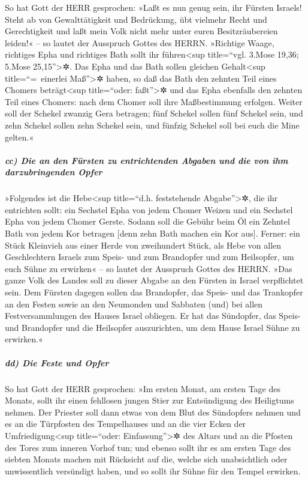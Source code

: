 So hat Gott der HERR gesprochen: »Laßt es nun genug sein,
ihr Fürsten Israels! Steht ab von Gewalttätigkeit und Bedrückung, übt
vielmehr Recht und Gerechtigkeit und laßt mein Volk nicht mehr unter
euren Besitzräubereien leiden!« -- so lautet der Ausspruch Gottes des
HERRN. »Richtige Waage, richtiges Epha und richtiges Bath
sollt ihr führen\textless sup title=``vgl. 3.Mose 19,36; 5.Mose
25,15''\textgreater✲. Das Epha und das Bath sollen
gleichen Gehalt\textless sup title=``=~einerlei Maß''\textgreater✲
haben, so daß das Bath den zehnten Teil eines Chomers
beträgt\textless sup title=``oder: faßt''\textgreater✲ und das Epha
ebenfalls den zehnten Teil eines Chomers: nach dem Chomer soll ihre
Maßbestimmung erfolgen. Weiter soll der Schekel zwanzig
Gera betragen; fünf Schekel sollen fünf Schekel sein, und zehn Schekel
sollen zehn Schekel sein, und fünfzig Schekel soll bei euch die Mine
gelten.«

\hypertarget{cc-die-an-den-fuxfcrsten-zu-entrichtenden-abgaben-und-die-von-ihm-darzubringenden-opfer}{%
\subparagraph{cc) Die an den Fürsten zu entrichtenden Abgaben und die
von ihm darzubringenden
Opfer}\label{cc-die-an-den-fuxfcrsten-zu-entrichtenden-abgaben-und-die-von-ihm-darzubringenden-opfer}}

»Folgendes ist die Hebe\textless sup title=``d.h.
feststehende Abgabe''\textgreater✲, die ihr entrichten sollt: ein
Sechstel Epha von jedem Chomer Weizen und ein Sechstel Epha von jedem
Chomer Gerste. Sodann soll die Gebühr beim Öl ein Zehntel
Bath von jedem Kor betragen {[}denn zehn Bath machen ein Kor aus{]}.
Ferner: ein Stück Kleinvieh aus einer Herde von
zweihundert Stück, als Hebe von allen Geschlechtern Israels zum Speis-
und zum Brandopfer und zum Heilsopfer, um euch Sühne zu erwirken« -- so
lautet der Ausspruch Gottes des HERRN. »Das ganze Volk
des Landes soll zu dieser Abgabe an den Fürsten in Israel verpflichtet
sein. Dem Fürsten dagegen sollen das Brandopfer, das
Speis- und das Trankopfer an den Festen sowie an den Neumonden und
Sabbaten (und) bei allen Festversammlungen des Hauses Israel obliegen.
Er hat das Sündopfer, das Speis- und Brandopfer und die Heilsopfer
auszurichten, um dem Hause Israel Sühne zu erwirken.«

\hypertarget{dd-die-feste-und-opfer}{%
\subparagraph{dd) Die Feste und Opfer}\label{dd-die-feste-und-opfer}}

So hat Gott der HERR gesprochen: »Im ersten Monat, am
ersten Tage des Monats, sollt ihr einen fehllosen jungen Stier zur
Entsündigung des Heiligtums nehmen. Der Priester soll
dann etwas von dem Blut des Sündopfers nehmen und es an die Türpfosten
des Tempelhauses und an die vier Ecken der Umfriedigung\textless sup
title=``oder: Einfassung''\textgreater✲ des Altars und an die Pfosten
des Tores zum inneren Vorhof tun; und ebenso sollt ihr es
am ersten Tage des siebten Monats machen mit Rücksicht auf die, welche
sich unabsichtlich oder unwissentlich versündigt haben, und so sollt ihr
Sühne für den Tempel erwirken.

